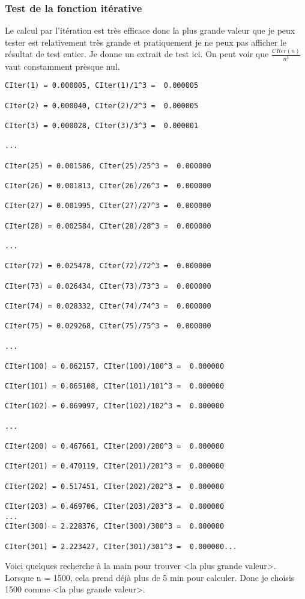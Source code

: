 \documentclass[french]{article}
\begin{document}
\subsubsection{Test de la fonction itérative}
Le calcul par l'itération est très efficace donc la plus grande valeur que je peux tester est relativement très grande et pratiquement je ne peux pas afficher le résultat de test entier. Je donne un extrait de test ici. On peut voir que $\frac{CIter(n)}{n^3}$ vaut constamment prèsque nul.
\begin{lstlisting}
CIter(1) = 0.000005, CIter(1)/1^3 =  0.000005

CIter(2) = 0.000040, CIter(2)/2^3 =  0.000005

CIter(3) = 0.000028, CIter(3)/3^3 =  0.000001

...

CIter(25) = 0.001586, CIter(25)/25^3 =  0.000000

CIter(26) = 0.001813, CIter(26)/26^3 =  0.000000

CIter(27) = 0.001995, CIter(27)/27^3 =  0.000000

CIter(28) = 0.002584, CIter(28)/28^3 =  0.000000

...

CIter(72) = 0.025478, CIter(72)/72^3 =  0.000000

CIter(73) = 0.026434, CIter(73)/73^3 =  0.000000

CIter(74) = 0.028332, CIter(74)/74^3 =  0.000000

CIter(75) = 0.029268, CIter(75)/75^3 =  0.000000

...

CIter(100) = 0.062157, CIter(100)/100^3 =  0.000000

CIter(101) = 0.065108, CIter(101)/101^3 =  0.000000

CIter(102) = 0.069097, CIter(102)/102^3 =  0.000000

...

CIter(200) = 0.467661, CIter(200)/200^3 =  0.000000

CIter(201) = 0.470119, CIter(201)/201^3 =  0.000000

CIter(202) = 0.517451, CIter(202)/202^3 =  0.000000

CIter(203) = 0.469706, CIter(203)/203^3 =  0.000000
...
CIter(300) = 2.228376, CIter(300)/300^3 =  0.000000

CIter(301) = 2.223427, CIter(301)/301^3 =  0.000000...
\end{lstlisting}
Voici quelques recherche à la main pour trouver <la plus grande valeur>. Lorsque n = 1500, cela prend déjà plus de 5 min pour calculer. Donc je choisis 1500 comme <la plus grande valeur>.
\end{document}
